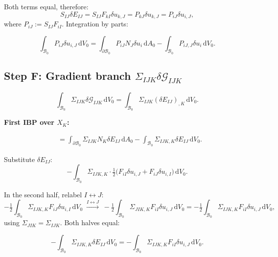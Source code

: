 \documentclass[11pt]{article}
\begin{document}
Both terms equal, therefore:
\begin{equation}
S_{IJ}\delta E_{IJ} = S_{IJ}F_{kI}\delta u_{k,J} = P_{kJ}\delta u_{k,J}
= P_{iJ}\delta u_{i,J},
\end{equation}
where $P_{iJ}:=S_{IJ}F_{iI}$. Integration by parts:

\begin{equation}
\int_{\mathcal{B}_0}P_{iJ}\delta u_{i,J}\,\mathrm{d}V_0
= \int_{\partial\mathcal{B}_0}P_{iJ}N_J\delta u_i\,\mathrm{d}A_0
- \int_{\mathcal{B}_0}P_{iJ,J}\delta u_i\,\mathrm{d}V_0.
\label{app:classical_ibp}
\end{equation}

\subsection{Step F: Gradient branch $\Sigma_{IJK}\delta\mathcal{G}_{IJK}$}

\begin{equation}
\int_{\mathcal{B}_0}\Sigma_{IJK}\delta\mathcal{G}_{IJK}\,\mathrm{d}V_0
= \int_{\mathcal{B}_0}\Sigma_{IJK}(\delta E_{IJ})_{,K}\,\mathrm{d}V_0.
\end{equation}

\textbf{First IBP over $X_K$:}

\begin{align}
&= \int_{\partial\mathcal{B}_0}\Sigma_{IJK}N_K\delta E_{IJ}\,\mathrm{d}A_0
   - \int_{\mathcal{B}_0}\Sigma_{IJK,K}\delta E_{IJ}\,\mathrm{d}V_0.
\label{app:grad_ibp1}
\end{align}

Substitute $\delta E_{IJ}$:
\begin{equation}
-\int_{\mathcal{B}_0}\Sigma_{IJK,K}\cdot\tfrac{1}{2}\bigl(F_{iI}\delta u_{i,J}+F_{iJ}\delta u_{i,I}\bigr)\,\mathrm{d}V_0.
\end{equation}

In the second half, relabel $I\leftrightarrow J$:
\begin{equation}
-\tfrac{1}{2}\int_{\mathcal{B}_0}\Sigma_{IJK,K}F_{iJ}\delta u_{i,I}\,\mathrm{d}V_0
\;\xrightarrow{I\leftrightarrow J}\;
-\tfrac{1}{2}\int_{\mathcal{B}_0}\Sigma_{JIK,K}F_{iI}\delta u_{i,J}\,\mathrm{d}V_0
= -\tfrac{1}{2}\int_{\mathcal{B}_0}\Sigma_{IJK,K}F_{iI}\delta u_{i,J}\,\mathrm{d}V_0,
\end{equation}
using $\Sigma_{JIK}=\Sigma_{IJK}$. Both halves equal:

\begin{equation}
-\int_{\mathcal{B}_0}\Sigma_{IJK,K}\delta E_{IJ}\,\mathrm{d}V_0
= -\int_{\mathcal{B}_0}\Sigma_{IJK,K}F_{iI}\delta u_{i,J}\,\mathrm{d}V_0.
\end{equation}
\end{document}
